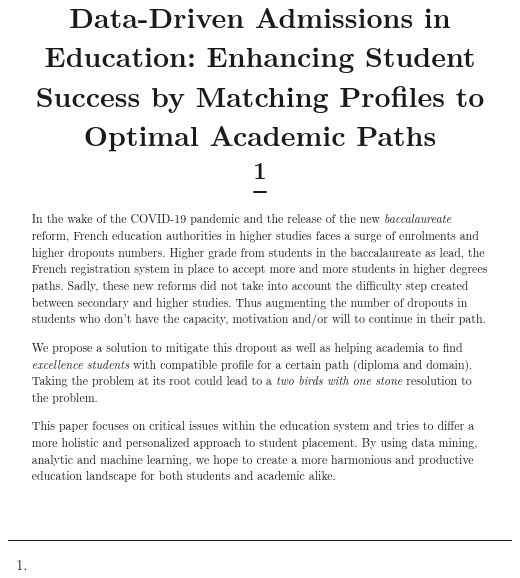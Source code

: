 \documentclass[conference]{IEEEtran}
\begin{document}
\title{Data-Driven Admissions in Education: Enhancing Student Success by Matching Profiles to Optimal Academic Paths\\
{\footnotesize \textsuperscript{}}
\thanks{}
}

\author{
}
\maketitle
\thispagestyle{plain}
\pagestyle{plain}

\tableofcontents
\vspace{16pt}
\listoffigures
\vspace{16pt}
\listoftables
\vspace{16pt}
\printglossary[type=\acronymtype, title=Accronymes, toctitle=Accronymes]

\vspace{32pt}
\begin{abstract}
In the wake of the COVID-19 pandemic and the release of the new \textit{baccalaureate} reform, French education authorities in higher studies faces a surge of enrolments and higher dropouts numbers. Higher grade from students in the baccalaureate as lead, the French registration system in place to accept more and more students in higher degrees paths. Sadly, these new reforms did not take into account the difficulty step created between secondary and higher studies. Thus augmenting the number of dropouts in students who don't have the capacity, motivation and/or will to continue in their path. 

We propose a solution to mitigate this dropout as well as helping academia to find \textit{excellence students} with compatible profile for a certain path (diploma and domain). Taking the problem at its root could lead to a \textit{two birds with one stone} resolution to the problem.

This paper focuses on critical issues within the education system and tries to differ a more holistic and personalized approach to student placement. By using data mining, analytic and machine learning, we hope to create a more harmonious and productive education landscape for both students and academic alike.
\end{abstract}
\vspace{8pt}
\end{document}
